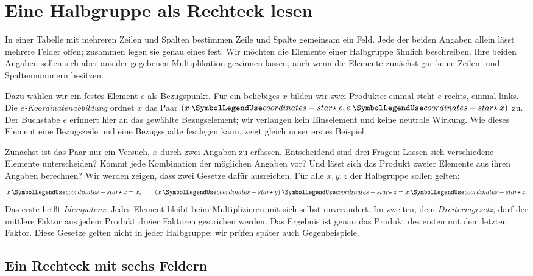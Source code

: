 \chapter*{Eine Halbgruppe als Rechteck lesen}
\hypertarget{coordinates.reading}{}

In einer Tabelle mit mehreren Zeilen und Spalten bestimmen
Zeile und Spalte gemeinsam ein Feld.
Jede der beiden Angaben allein lässt mehrere Felder offen; zusammen
legen sie genau eines fest. Wir möchten die Elemente einer Halbgruppe
ähnlich beschreiben. Ihre beiden Angaben sollen sich aber aus der
gegebenen Multiplikation gewinnen lassen, auch wenn die Elemente
zunächst gar keine Zeilen- und Spaltennummern besitzen.

Dazu wählen wir ein festes Element \(e\) als Bezugspunkt.
Für ein beliebiges \(x\) bilden wir zwei Produkte: einmal steht
\(e\) rechts, einmal links. Die
\emph{\(e\)-Koordinatenabbildung} ordnet \(x\) das Paar
\((x\CRStar e,e\CRStar x)\) zu. Der Buchstabe \(e\) erinnert
hier an das gewählte Bezugselement; wir verlangen kein Einselement
und keine neutrale Wirkung. Wie dieses Element eine Bezugszeile und
eine Bezugsspalte festlegen kann, zeigt gleich unser erstes Beispiel.

Zunächst ist das Paar nur ein Versuch, \(x\) durch zwei Angaben
zu erfassen. Entscheidend sind drei Fragen: Lassen sich verschiedene
Elemente unterscheiden? Kommt jede Kombination der möglichen Angaben
vor? Und lässt sich das Produkt zweier Elemente aus ihren Angaben
berechnen? Wir werden zeigen, dass zwei Gesetze dafür ausreichen.
Für alle \(x,y,z\) der Halbgruppe sollen gelten:
\[
  x\CRStar x=x,
  \qquad (x\CRStar y)\CRStar z=x\CRStar z.
\]
Das erste heißt \emph{Idempotenz}: Jedes Element bleibt beim
Multiplizieren mit sich selbst unverändert. Im zweiten, dem
\emph{Dreitermgesetz}, darf der mittlere Faktor aus jedem Produkt
dreier Faktoren gestrichen werden. Das Ergebnis ist genau das
Produkt des ersten mit dem letzten Faktor. Diese Gesetze gelten
nicht in jeder Halbgruppe; wir prüfen später auch Gegenbeispiele.

\section*{Ein Rechteck mit sechs Feldern}
\hypertarget{coordinates.reading.rectangle}{}

